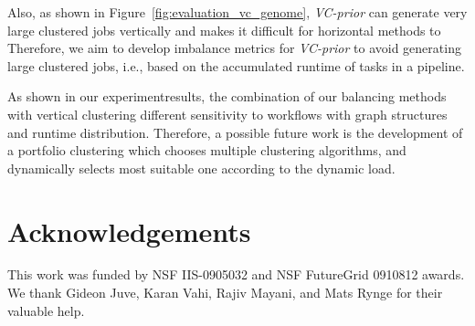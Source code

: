 Also, as shown in Figure~\ref{fig:evaluation_vc_genome}, \emph{VC-prior} can generate very large clustered jobs vertically and makes it difficult for horizontal methods to Therefore, we aim to develop imbalance metrics for \emph{VC-prior} to avoid generating large clustered jobs, i.e., based on the accumulated runtime of tasks in a pipeline. 

As shown in our experimentresults, the combination of our balancing methods with vertical clustering different sensitivity to workflows with graph structures and runtime distribution. Therefore, a possible future work is the development of a portfolio clustering which chooses multiple clustering algorithms, and dynamically selects most suitable one according to the dynamic load.



\section*{Acknowledgements}
\footnotesize
This work was funded by NSF IIS-0905032 and NSF FutureGrid 0910812 awards. We thank Gideon Juve, Karan Vahi, Rajiv Mayani, and Mats Rynge for their valuable help. 